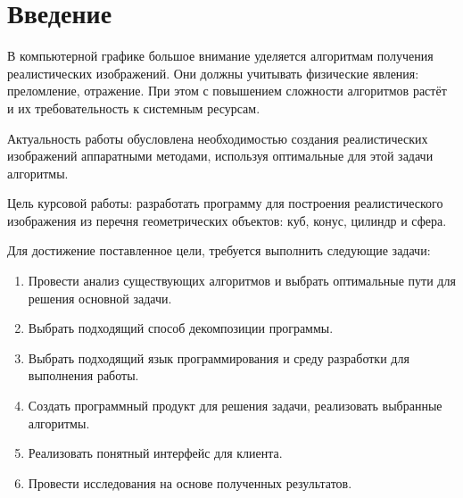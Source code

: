 \newpage
{}

\chapter*{Введение}
В компьютерной графике большое внимание уделяется алгоритмам получения реалистических изображений. 
Они должны учитывать физические явления: преломление, отражение.
При этом с повышением сложности алгоритмов растёт и их требовательность к системным ресурсам. 

Актуальность работы обусловлена необходимостью создания реалистических изображений аппаратными методами, используя оптимальные для этой задачи алгоритмы.

Цель курсовой работы: разработать программу для построения реалистического изображения из перечня геометрических объектов: куб, конус, цилиндр и сфера.

Для достижение поставленное цели, требуется выполнить следующие задачи:
\begin{enumerate}
	\item Провести анализ существующих алгоритмов и выбрать оптимальные пути для решения основной задачи.
	\item Выбрать подходящий способ декомпозиции программы.
	\item Выбрать подходящий язык программирования и среду разработки для выполнения работы.
	\item Создать программный продукт для решения задачи, реализовать выбранные алгоритмы.
	\item Реализовать понятный интерфейс для клиента.
	\item Провести исследования на основе полученных результатов.
\end{enumerate}
